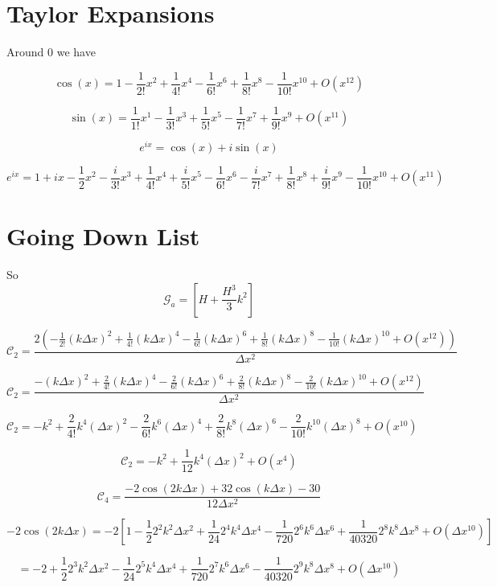 \documentclass[12pt]{article}
\begin{document}
\section{Taylor Expansions}
Around $0$ we have

\[\cos\left(x\right) = 1 - \frac{1}{2!} x^2 + \frac{1}{4!} x^4 - \frac{1}{6!} x^6 + \frac{1}{8!} x^8 - \frac{1}{10!} x^{10} + O(x^{12})\]

\[\sin\left(x\right) = \frac{1}{1!} x^1 - \frac{1}{3!} x^3 + \frac{1}{5!} x^5 - \frac{1}{7!} x^7 + \frac{1}{9!} x^{9} + O(x^{11})\]

\[e^{ix} = \cos(x) + i \sin(x)\]

\[e^{ix} = 1 + i x  - \frac{1}{2} x^2 - \frac{i}{3!} x^3 + \frac{1}{4!} x^4 + \frac{i}{5!} x^5 - \frac{1}{6!} x^6 - \frac{i}{7!} x^7 + \frac{1}{8!} x^8 + \frac{i}{9!} x^{9} - \frac{1}{10!} x^{10}+ O(x^{11}) \]

\section{Going Down List}

So 
\[\mathcal{G}_a =  \left[H + \frac{H^3}{3} k^2\right]\]

\[\mathcal{C}_2 = \frac{ 2\left(- \frac{1}{2!} (k\Delta x)^2 + \frac{1}{4!} (k\Delta x)^4 - \frac{1}{6!} (k\Delta x)^6 + \frac{1}{8!} (k\Delta x)^8 - \frac{1}{10!} (k\Delta x)^{10} + O(x^{12})\right) }{\Delta x^2}\]

\[\mathcal{C}_2 = \frac{- (k\Delta x)^2 + \frac{2}{4!} (k\Delta x)^4 - \frac{2}{6!} (k\Delta x)^6 + \frac{2}{8!} (k\Delta x)^8 - \frac{2}{10!} (k\Delta x)^{10} + O(x^{12}) }{\Delta x^2}\]

\[\mathcal{C}_2 = - k^2+ \frac{2}{4!} k^4(\Delta x)^2 - \frac{2}{6!} k^6(\Delta x)^4 + \frac{2}{8!} k^8(\Delta x)^6 - \frac{2}{10!} k^{10}(\Delta x)^{8} + O(x^{10}) \]

\[\mathcal{C}_2 = - k^2+ \frac{1}{12} k^4(\Delta x)^2 + O(x^{4}) \]

\[\mathcal{C}_4 = \frac{-2\cos\left(2k\Delta x\right) + 32\cos\left(k\Delta x\right)  - 30 }{12\Delta x^2}\]

\[-2\cos\left(2 k \Delta x\right) = -2\left[1 - \frac{1}{2} 2^2 k^2 \Delta x ^2 + \frac{1}{24} 2^4 k^4 \Delta x ^4 - \frac{1}{720} 2^6 k^6 \Delta x ^6 + \frac{1}{40320} 2^8 k^8 \Delta x^8 + O(\Delta x ^{10})\right]\]

\[= -2 + \frac{1}{2} 2^3 k^2 \Delta x ^2 - \frac{1}{24} 2^5 k^4 \Delta x ^4 + \frac{1}{720} 2^7 k^6 \Delta x ^6 - \frac{1}{40320} 2^9 k^8 \Delta x^8 + O(\Delta x ^{10})\]
\end{document}
